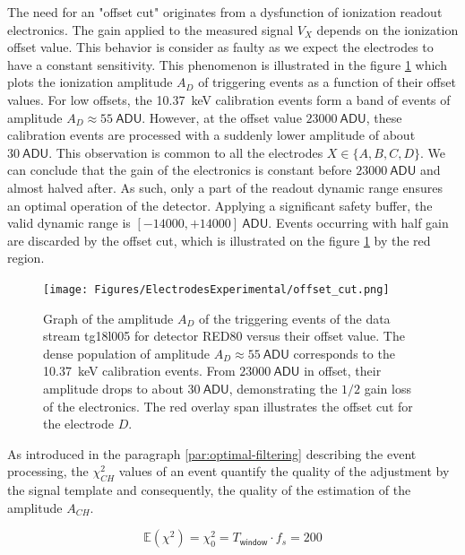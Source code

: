 The need for an "offset cut" originates from a dysfunction of ionization readout electronics. The gain applied to the measured signal $V_X$ depends on the ionization offset value. This behavior is consider as faulty as we expect the electrodes to have a constant sensitivity. This phenomenon is illustrated in the figure \ref{fig:offset-problem} which plots the ionization amplitude $A_D$ of triggering events as a function of their offset values. For low offsets, the \SI{10.37}{\kilo\eV} calibration events form a band of events of amplitude $A_{D} \approx \SI{55}{\textsf{ADU}}$. However, at the offset value $\SI{23000}{\textsf{ADU}}$, these calibration events are processed with a suddenly lower amplitude of about $\SI{30}{\textsf{ADU}}$. This observation is common to all the electrodes $X \in \{ A,B,C,D \}$. We can conclude that the gain of the electronics is constant before $\SI{23000}{\textsf{ADU}}$ and almost halved after. As such, only a part of the readout dynamic range ensures an optimal operation of the detector. Applying a significant safety buffer, the valid dynamic range is $[-14000, +14000]\ \textsf{ADU}$. Events occurring with half gain are discarded by the offset cut, which is illustrated on the figure \ref{fig:offset-problem} by the red region.

\begin{figure}
\centering
\texttt{[image: Figures/ElectrodesExperimental/offset\_cut.png]}
\caption{Graph of the amplitude $A_{D}$ of the triggering events of the data stream tg18l005 for detector RED80 versus their offset value. The dense population of amplitude $A_{D} \approx \SI{55}{\textsf{ADU}}$ corresponds to the \SI{10.37}{\kilo\eV} calibration events. From $\SI{23000}{\textsf{ADU}}$ in offset, their amplitude drops to about $\SI{30}{\textsf{ADU}}$, demonstrating the  $1/2$ gain loss of the electronics. The red overlay span illustrates the offset cut for the electrode $D$.}
\label{fig:offset-problem}
\end{figure}


As introduced in the paragraph \ref{par:optimal-filtering} describing the event processing, the $\chi_{CH}^2$ values of an event quantify the quality of the adjustment by the signal template and consequently, the quality of the estimation of the amplitude $A_{CH}$.

\begin{equation}
\mathbb{E}\left( \chi^2 \right)  = \chi_0^2
 = T_{\textsf{window}} \cdot f_s = 200
\end{equation}

